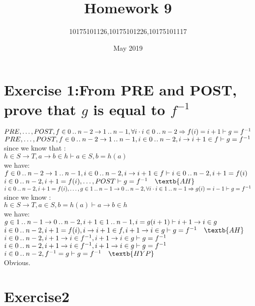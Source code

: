 \documentclass[11pt,a4paper,fleqn]{article}
\title{Homework 9}
\author{10175101126,10175101226,10175101117}
\date{May 2019}
\begin{document}
\maketitle


\section{Exercise 1:From PRE and POST, prove that $g$ is equal to  $f^{-1}$}
\noindent
$PRE,\ldots,POST ,f \in 0 \mathbin{.\mkern1mu.} n-2 \rightarrow 1 \mathbin{.\mkern1mu.} n-1, \forall i \cdot i\in 0\mathbin{.\mkern1mu.} n-2 \Rightarrow f(i)=i+1 \vdash g = f^{-1}  $\\
$PRE,\ldots,POST ,f \in 0 \mathbin{.\mkern1mu.} n-2 \rightarrow 1 \mathbin{.\mkern1mu.} n-1, i\in 0\mathbin{.\mkern1mu.} n-2 , i \rightarrow i+1 \in f \vdash g = f^{-1}  $\\
since we know that :\\
$h\in S \rightarrow T,a \rightarrow b \in h \vdash a \in S,b=h(a) $\\
we have:\\
$ f \in 0 \mathbin{.\mkern1mu.} n-2 \rightarrow 1 \mathbin{.\mkern1mu.} n-1,i\in 0\mathbin{.\mkern1mu.} n-2 , i \rightarrow i+1 \in f \vdash i \in 0\mathbin{.\mkern1mu.} n-2,i+1 = f(i) $\\
$ i\in 0\upto n-2 ,i+1 = f(i) ,\ldots,POST  \vdash g = f^{-1} \quad \textb{AH} $\\
$ i\in 0\mathbin{.\mkern1mu.} n-2 ,i+1 = f(i) ,\ldots, g \in 1 \mathbin{.\mkern1mu.} n-1 \rightarrow 0 \mathbin{.\mkern1mu.} n-2, \forall i \cdot i \in 1 \mathbin{.\mkern1mu.} n-1 \Rightarrow g(i) = i-1  \vdash g = f^{-1}  $\\
since we know :\\
$ h \in S \rightarrow T, a \in S,b = h(a) \vdash a \rightarrow b \in h $\\
we have:\\
$ g \in 1 \mathbin{.\mkern1mu.} n-1 \rightarrow 0\mathbin{.\mkern1mu.} n-2, i+1 \in 1 \mathbin{.\mkern1mu.} n-1, i = g(i+1) \vdash i+1 \rightarrow i \in g $\\
$ i\in 0\upto n-2 ,i+1 = f(i) ,i \rightarrow i+1 \in f,i+1 \rightarrow i \in g  \vdash g = f^{-1}  \quad \textb{AH}$\\
$ i\in 0\mathbin{.\mkern1mu.} n-2 ,i+1 \rightarrow i \in f^{-1},i+1 \rightarrow i \in g  \vdash g = f^{-1} $\\
$ i\in 0\mathbin{.\mkern1mu.} n-2 ,i+1 \rightarrow i \in f^{-1},i+1 \rightarrow i \in g  \vdash g = f^{-1} $\\
$ i\in 0\upto n-2 , f^{-1} = g  \vdash g = f^{-1} \quad \textb{HYP}$\\
Obvious.



\section{Exercise2 }
\end{document}
